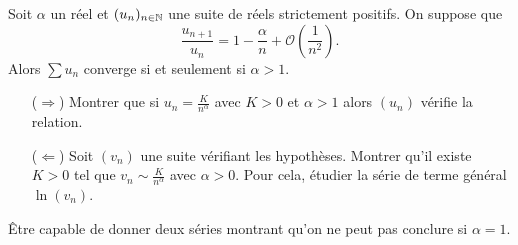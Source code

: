 \begin{theo}
    Soit $\alpha$ un réel et $(u_n)_{n \in \mathbb{N}}$ une suite de réels strictement positifs. On suppose que
    $$\displaystyle \frac{u_{n+1}}{u_n} = 1 - \frac{\alpha}{n} + \mathcal{O} \left( \frac{1}{n^2} \right).$$ Alors $\sum u_n$ converge si et seulement si $\alpha > 1$. 
\end{theo}
\begin{enumerate}
    \item[($\Rightarrow$)] Montrer que si $u_n=\frac{K}{n^{\alpha}}$ avec $K>0$ et $\alpha > 1$ alors $(u_n)$ vérifie la relation.
    \item[($\Leftarrow$)] Soit $(v_n)$ une suite vérifiant les hypothèses. Montrer qu'il existe $K>0$ tel que $v_n \sim \frac{K}{n^{\alpha}}$ avec $\alpha > 0$. Pour cela, étudier la série de terme général $\ln (v_n)$.
\end{enumerate}

Être capable de donner deux séries montrant qu'on ne peut pas conclure si $\alpha=1$.